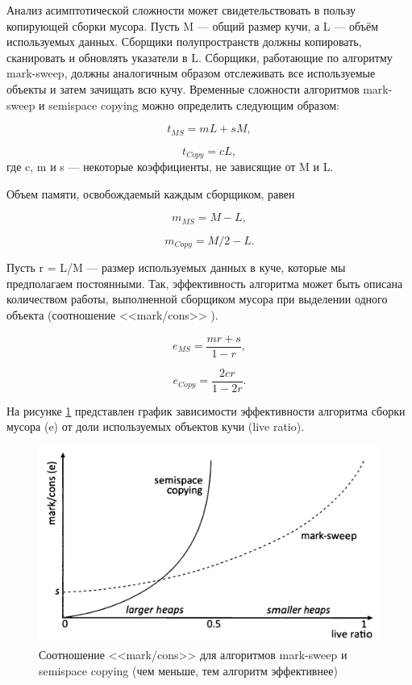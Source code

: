 Анализ асимптотической сложности может свидетельствовать в пользу копирующей сборки мусора. Пусть M --- общий размер кучи, а L --- объём используемых данных. Сборщики полупространств должны копировать, сканировать и обновлять указатели в L. Сборщики, работающие по алгоритму mark-sweep, должны аналогичным образом отслеживать все используемые объекты и затем зачищать всю кучу. Временные сложности алгоритмов mark-sweep и semispace copying можно определить следующим образом: \cite{handbook}

\begin{equation}
	t_{MS} = mL + sM,
\end{equation}

\begin{equation}
	t_{Copy} = cL,
\end{equation}
где c, m и s --- некоторые коэффициенты, не зависящие от M и L.

Объем памяти, освобождаемый каждым сборщиком, равен

\begin{equation}
	m_{MS} = M - L,
\end{equation}

\begin{equation}
	m_{Copy} = M/2 - L.
\end{equation}

Пусть r = L/M --- размер используемых данных в куче, которые мы предполагаем постоянными. Так, эффективность алгоритма может быть описана количеством работы, выполненной сборщиком мусора при выделении одного объекта (соотношение <<mark/cons>> \cite{handbook}).

\begin{equation}
	e_{MS} = \frac{mr + s}{1 - r},
\end{equation}

\begin{equation}
	e_{Copy} = \frac{2cr}{1 - 2r}.
\end{equation}

На рисунке \ref{fig:complexity} представлен график зависимости эффективности алгоритма сборки мусора (e) от доли используемых объектов кучи (live ratio). \cite{handbook}

\begin{figure}[H]
	\centering
	\includegraphics[width=\textwidth]{assets/complexity.png}
	\caption{Соотношение <<mark/cons>> для алгоритмов mark-sweep и semispace copying (чем меньше, тем алгоритм эффективнее)}
	\label{fig:complexity}
\end{figure}

